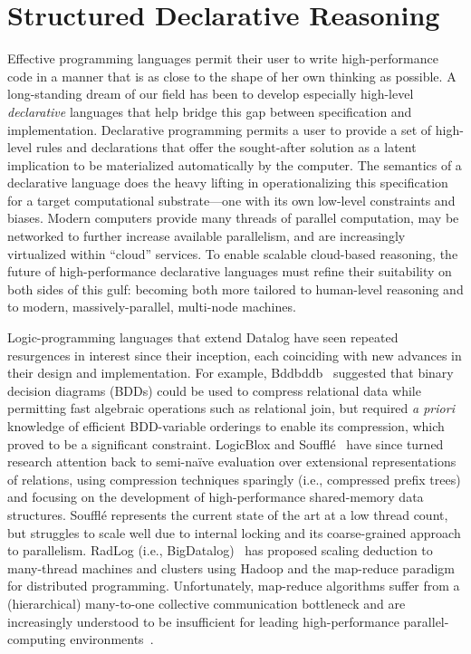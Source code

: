 \section{Structured Declarative Reasoning}
\label{sec:intro}
%
Effective programming languages permit their user to write high-performance code in a manner that is as close to the shape of her own thinking as possible. 
A long-standing dream of our field has been to develop especially high-level \emph{declarative} languages that help bridge this gap between specification and implementation. Declarative programming permits a user to provide a set of high-level rules and declarations that offer the sought-after solution as a latent implication to be materialized automatically by the computer. 
The semantics of a declarative language does the heavy lifting in operationalizing this specification for a target computational substrate---one with its own low-level constraints and biases. Modern computers provide many threads of parallel computation, may be networked to further increase available parallelism, and are increasingly virtualized within ``cloud'' services. To enable scalable cloud-based reasoning, the future of high-performance declarative languages must refine their suitability on both sides of this gulf: becoming both more tailored to human-level reasoning and to modern, massively-parallel, multi-node machines.

Logic-programming languages that extend Datalog have seen repeated resurgences in interest since their inception, each coinciding with new advances in their design and implementation.
For example, Bddbddb~\cite{whaley2005using} suggested that binary decision diagrams (BDDs) could be used to compress relational data while permitting fast algebraic operations such as relational join, but required \emph{a priori} knowledge of efficient BDD-variable orderings to enable its compression, which proved to be a significant constraint.
LogicBlox and Souffl\'e~\cite{antoniadis2017porting,10.1007/978-3-319-41540-6} have since turned research attention back to semi-na\"ive evaluation over extensional representations of relations, using compression techniques sparingly (i.e., compressed prefix trees) and focusing on the development of high-performance shared-memory data structures.
Souffl\'e represents the current state of the art at a low thread count, but struggles to scale well due to internal locking and its coarse-grained approach to parallelism.
RadLog (i.e., BigDatalog)~\cite{bigdl} has proposed scaling deduction to many-thread machines and clusters using Hadoop and the map-reduce paradigm for distributed programming. Unfortunately, map-reduce algorithms suffer from a (hierarchical) many-to-one collective communication bottleneck and are increasingly understood to be insufficient for leading high-performance parallel-computing environments~\cite{Anderson:2017,SparkBadMPIGood}.

